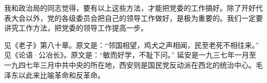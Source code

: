 我和政治局的同志觉得，要有以上这些方法，才能把党委的工作搞好。除了开好代表大会以外，党的各级委员会把自己的领导工作做好，是极为重要的。我们一定要讲究工作方法，把党委的领导工作提高一步。


\begin{maonote}
见《老子》第八十章。原文是：“邻国相望，鸡犬之声相闻，民至老死不相往来。”
见《论语·公冶长》。原文是：“敏而好学，不耻下问。”
延安是一九三七年一月至一九四七年三月中共中央的所在地，西安则是国民党反动派在西北的统治中心。毛泽东以此来比喻革命和反革命。
\end{maonote}
